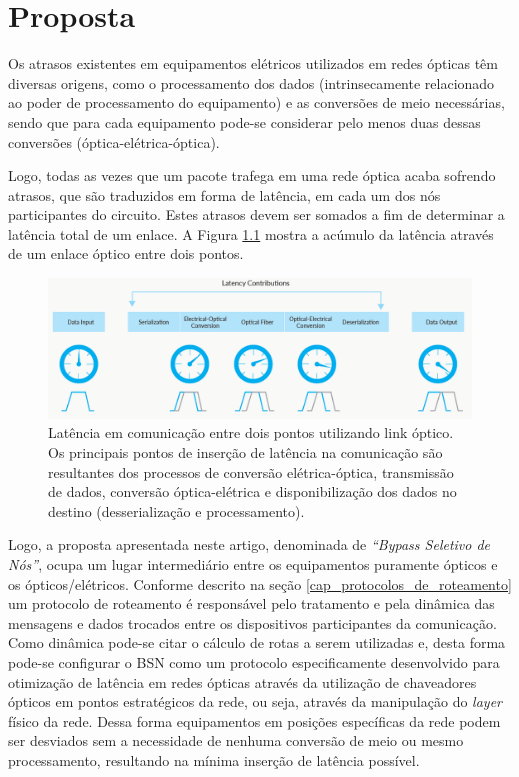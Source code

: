 \chapter{Proposta}
\label{capitulo_proposta}
Os atrasos existentes em equipamentos elétricos utilizados em redes ópticas têm diversas origens, como o processamento dos dados (intrinsecamente relacionado ao poder de processamento do equipamento) e as conversões de meio necessárias, sendo que para cada equipamento pode-se considerar pelo menos duas dessas conversões (óptica-elétrica-óptica). 

Logo, todas as vezes que um pacote trafega em uma rede óptica acaba sofrendo atrasos, que são traduzidos em forma de latência, em cada um dos nós participantes do circuito. Estes atrasos devem ser somados a fim de determinar a latência total de um enlace. A Figura \ref{fig_latency_link} mostra a acúmulo da latência através de um enlace óptico entre dois pontos. 

\begin{figure} [!htb]%
	\centering
	\includegraphics[width=1\textwidth]{./figuras/latency-link.png}
	\caption[Latência de Link]{Latência em comunicação entre dois pontos utilizando link óptico. Os principais pontos de inserção de latência na comunicação são resultantes dos processos de conversão elétrica-óptica, transmissão de dados, conversão óptica-elétrica e disponibilização dos dados no destino (desserialização e processamento).}
	\label{fig_latency_link}
\end{figure}

Logo, a proposta apresentada neste artigo, denominada de  \emph{``Bypass Seletivo de Nós''}, ocupa um lugar intermediário entre os equipamentos puramente ópticos e os ópticos/elétricos. Conforme descrito na seção \ref{cap_protocolos_de_roteamento} um protocolo de roteamento é responsável pelo tratamento e pela dinâmica das mensagens e dados trocados entre os dispositivos participantes da comunicação. Como dinâmica pode-se citar o cálculo de rotas a serem utilizadas e, desta forma pode-se configurar o BSN como um protocolo especificamente desenvolvido para otimização de latência em redes ópticas através da utilização de chaveadores ópticos em pontos estratégicos da rede, ou seja, através da manipulação do \emph{layer} físico da rede. Dessa forma equipamentos em posições específicas da rede podem ser desviados sem a necessidade de nenhuma conversão de meio ou mesmo processamento, resultando na mínima inserção de latência possível. 

